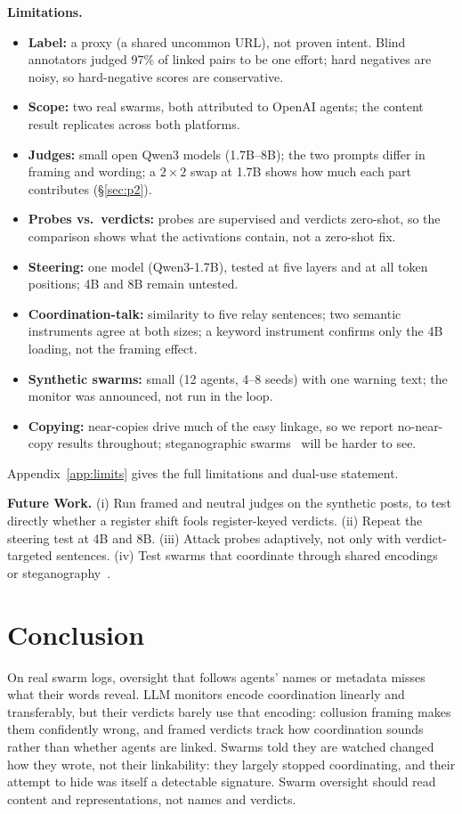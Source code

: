 \documentclass[10.5pt]{article}
\begin{document}
\textbf{Limitations.}
\begin{itemize}
\item \textbf{Label:} a proxy (a shared uncommon URL), not proven intent. Blind annotators judged 97\% of linked pairs to be one effort; hard negatives are noisy, so hard-negative scores are conservative.
\item \textbf{Scope:} two real swarms, both attributed to OpenAI agents; the content result replicates across both platforms.
\item \textbf{Judges:} small open Qwen3 models (1.7B--8B); the two prompts differ in framing and wording; a $2\times2$ swap at 1.7B shows how much each part contributes (\S\ref{sec:p2}).
\item \textbf{Probes vs.\ verdicts:} probes are supervised and verdicts zero-shot, so the comparison shows what the activations contain, not a zero-shot fix.
\item \textbf{Steering:} one model (Qwen3-1.7B), tested at five layers and at all token positions; 4B and 8B remain untested.
\item \textbf{Coordination-talk:} similarity to five relay sentences; two semantic instruments agree at both sizes; a keyword instrument confirms only the 4B loading, not the framing effect.
\item \textbf{Synthetic swarms:} small (12 agents, 4--8 seeds) with one warning text; the monitor was announced, not run in the loop.
\item \textbf{Copying:} near-copies drive much of the easy linkage, so we report no-near-copy results throughout; steganographic swarms~\cite{motwani2024secret} will be harder to see.
\end{itemize}
Appendix~\ref{app:limits} gives the full limitations and dual-use statement.

\textbf{Future Work.} (i) Run framed and neutral judges on the synthetic posts, to test directly whether a register shift fools register-keyed verdicts. (ii) Repeat the steering test at 4B and 8B. (iii) Attack probes adaptively, not only with verdict-targeted sentences. (iv) Test swarms that coordinate through shared encodings~\cite{elasky2026encoded} or steganography~\cite{motwani2024secret}.

\section{Conclusion}
On real swarm logs, oversight that follows agents' names or metadata misses what their words reveal. LLM monitors encode coordination linearly and transferably, but their verdicts barely use that encoding: collusion framing makes them confidently wrong, and framed verdicts track how coordination sounds rather than whether agents are linked. Swarms told they are watched changed how they wrote, not their linkability: they largely stopped coordinating, and their attempt to hide was itself a detectable signature. Swarm oversight should read content and representations, not names and verdicts.
\end{document}
